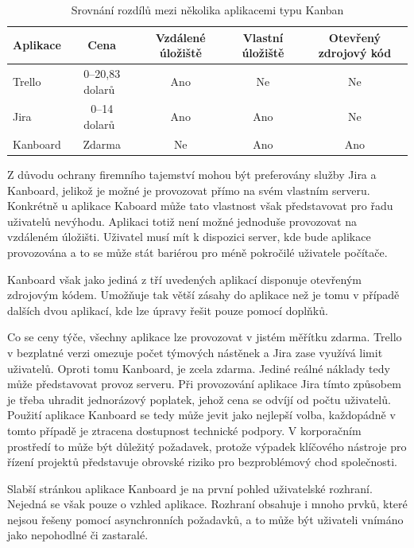 \begin{table}[hbt]
\centering
\caption{Srovnání rozdílů mezi několika aplikacemi typu Kanban}
\label{tab:kanban-sum}
\begin{tabular}{ |l|c|c|c|c| } 
\hline
Aplikace & Cena\footnotemark & Vzdálené úložiště & Vlastní úložiště & Otevřený zdrojový kód  \\
\hline
Trello & 0--20,83 dolarů~\cite{bib:trello-pricing} & Ano & Ne & Ne \\ 
Jira & 0--14 dolarů~\cite{bib:jira-pricing} & Ano & Ano & Ne \\ 
Kanboard & Zdarma & Ne & Ano & Ano \\ 
\hline
\end{tabular}
\end{table}


Z důvodu ochrany firemního tajemství mohou být preferovány služby Jira a Kanboard, jelikož je možné je provozovat přímo na svém vlastním serveru. Konkrétně u aplikace Kaboard může tato vlastnost však představovat pro řadu uživatelů nevýhodu. Aplikaci totiž není možné jednoduše provozovat na vzdáleném úložišti. Uživatel musí mít k dispozici server, kde bude aplikace provozována a to se může stát bariérou pro méně pokročilé uživatele počítače.

Kanboard však jako jediná z tří uvedených aplikací disponuje otevřeným zdrojovým kódem. Umožňuje tak větší zásahy do aplikace než je tomu v případě dalších dvou aplikací, kde lze úpravy řešit pouze pomocí doplňků.

Co se ceny týče, všechny aplikace lze provozovat v jistém měřítku zdarma. Trello v bezplatné verzi omezuje počet týmových nástěnek a Jira zase využívá limit uživatelů. Oproti tomu Kanboard, je zcela zdarma. Jediné reálné náklady tedy může představovat provoz serveru. Při provozování aplikace Jira tímto způsobem je třeba uhradit jednorázový poplatek, jehož cena se odvíjí od počtu uživatelů. Použití aplikace Kanboard se tedy může jevit jako nejlepší volba, každopádně v tomto případě je ztracena dostupnost technické podpory. V korporačním prostředí to může být důležitý požadavek, protože výpadek klíčového nástroje pro řízení projektů představuje obrovské riziko pro bezproblémový chod společnosti.

Slabší stránkou aplikace Kanboard je na první pohled uživatelské rozhraní. Nejedná se však pouze o vzhled aplikace. Rozhraní obsahuje i mnoho prvků, které nejsou řešeny pomocí asynchronních požadavků, a to může být uživateli vnímáno jako nepohodlné či zastaralé.


